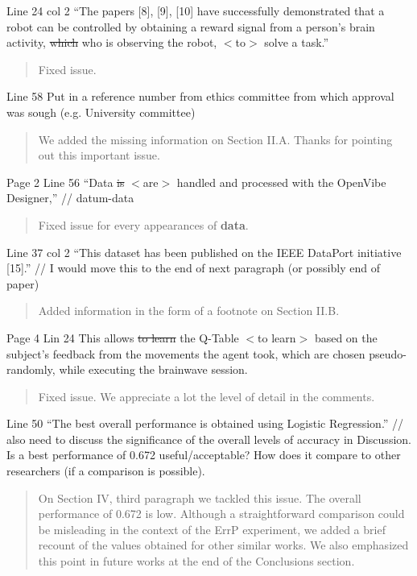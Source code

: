 \documentclass[journal,onecolumn,12pt]{IEEEtran}
\begin{document}
Line 24 col 2 “The papers [8], [9], [10] have successfully demonstrated that a robot can be controlled by obtaining a reward signal from a person’s brain activity, \sout{which} who is observing the robot, $<$to$>$ solve a task.”

\begin{quotation}
{\color{blue}
Fixed issue.
}
\end{quotation}

Line 58 Put in a reference number from ethics committee from which approval was sough (e.g. University committee)

\begin{quotation}
{\color{blue}
We added the missing information on Section II.A.  Thanks for pointing out this important issue.
}
\end{quotation}

Page 2
Line 56 “Data \sout{is} $<$are$>$ handled and processed with the OpenVibe Designer,” // datum-data

\begin{quotation}
{\color{blue}
Fixed issue for every appearances of \textbf{data}.
}
\end{quotation}

Line 37 col 2 “This dataset has been published on the IEEE DataPort initiative [15].” // I would move this to the end of next paragraph (or possibly end of paper)

\begin{quotation}
{\color{blue}
Added information in the form of a footnote on Section II.B.
}
\end{quotation}

Page 4
Lin 24 This allows \sout{to learn} the Q-Table $<$to learn$>$ based on the subject’s feedback from the movements the agent
took, which are chosen pseudo-randomly, while executing the brainwave session.

\begin{quotation}
{\color{blue}
Fixed issue.  We appreciate a lot the level of detail in the comments.
}
\end{quotation}

Line 50 “The best overall performance is obtained using Logistic Regression.” // also need to discuss the significance of the overall levels of accuracy in Discussion. Is a best performance of 0.672 useful/acceptable? How does it compare to other researchers (if a comparison is possible).

\begin{quotation}
{\color{blue}
On Section IV, third paragraph we tackled this issue.  The overall performance of 0.672 is low.  Although a straightforward comparison could be misleading in the context of the ErrP experiment, we added a brief recount of the values obtained for other similar works.  We also emphasized this point in future works at the end of the Conclusions section.
}
\end{quotation}
\end{document}
